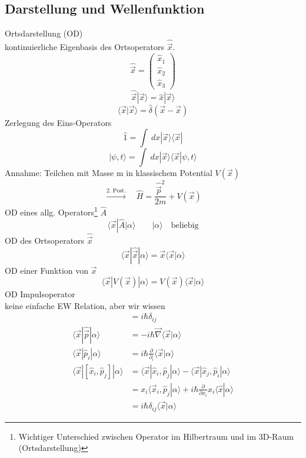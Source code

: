 \documentclass[10pt,article,colorback,accentcolor=tud9d]{scrartcl}
\begin{document}
\subsection{Darstellung und Wellenfunktion}
Ortsdarstellung (OD)\\
kontinuierliche Eigenbasis des Ortsoperators $\hat{\vec{x}}$.
$$
\hat{\vec{x}}=\left(\begin{array}{c} \hat{x}_1 \\ \hat{x}_2 \\ \hat{x}_3 \end{array}\right)
$$
$$
\hat{\vec{x}}|\vec{x}\rangle=\hat{x}|\vec{x}\rangle
$$
\begin{equation}
\langle\vec{x}|\vec{x}\rangle=\hat{\delta}(\vec{x}-\vec{x})
\end{equation}
Zerlegung des Eins-Operators
$$
\hat{1}=\int\ dx \left|\vec{x}\rangle\langle\vec{x}\right|
$$
\begin{equation}
|\psi,t\rangle=\int\ dx\left|\vec{x}\rangle\langle\vec{x}\right|\psi,t\rangle
\label{eq:WellenfunktionOrtsdarstellung}
\end{equation}
Annahme: Teilchen mit Masse m in klassischem Potential $V(\vec{x})$
\begin{equation}
\xrightarrow{\text{2. Post.}} \quad \hat{H}=\frac{\hat{\vec{p}}^2}{2m}+V(\vec{x})
\label{eq:Hamiltonoperator}
\end{equation}
OD eines allg. Operators\footnote{Wichtiger Unterschied zwischen Operator im Hilbertraum und im 3D-Raum (Ortsdarstellung)} $\hat{A}$
$$
\langle\vec{x}\left|\right.\hat{A}|\alpha\rangle \quad \quad |\alpha\rangle \quad \text{beliebig}
$$
OD des Ortsoperators $\hat{\vec{x}}$
$$
\langle\vec{x}|\hat{\vec{x}}|\alpha\rangle=\vec{x}\langle\vec{x}|\alpha\rangle
$$
OD einer Funktion von $\vec{x}$
$$
\langle\vec{x}|V(\vec{x})|\alpha\rangle=V(\vec{x})\langle\vec{x}|\alpha\rangle
$$
OD Impulsoperator\\
keine einfache EW Relation, aber wir wissen
\begin{align}
[\hat{x}_i,\hat{p}_j]&=i\hbar\delta_{ij} \nonumber\\ \nonumber
\langle\vec{x}|\hat{\vec{p}}|\alpha\rangle&=-i\hbar\vec{\nabla}\langle\vec{x}|\alpha\rangle\\ \nonumber
\langle\vec{x}|\hat{p}_i|\alpha\rangle&=i\hbar\frac{\partial}{\partial_i}\langle\vec{x}|\alpha\rangle\\ \nonumber
\langle\vec{x}|[\hat{x}_i,\hat{p}_j]|\alpha\rangle&=\langle\vec{x}|\hat{x}_i,\hat{p}_j|\alpha\rangle-\langle\vec{x}|\hat{x}_j,\hat{p}_i|\alpha\rangle\\ 
&=x_i\langle\vec{x}_i,\hat{p}_j|\alpha\rangle+i\hbar\frac{\partial}{\partial x_i}x_i\langle\hat{x}|\alpha\rangle\nonumber\\
&=i\hbar\delta_{ij}\langle\vec{x}|\alpha\rangle
\end{align}
\end{document}
